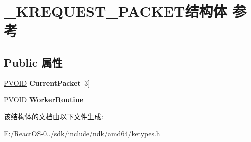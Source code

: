\hypertarget{struct___k_r_e_q_u_e_s_t___p_a_c_k_e_t}{}\section{\+\_\+\+K\+R\+E\+Q\+U\+E\+S\+T\+\_\+\+P\+A\+C\+K\+E\+T结构体 参考}
\label{struct___k_r_e_q_u_e_s_t___p_a_c_k_e_t}
\subsection*{Public 属性}
\begin{DoxyCompactItemize}
\item 
\mbox{\label{struct___k_r_e_q_u_e_s_t___p_a_c_k_e_t_aa53e0e21171918bcb9c66d429fe69865}} 
\hyperlink{interfacevoid}{P\+V\+O\+ID} {\bfseries Current\+Packet} \mbox{[}3\mbox{]}
\item 
\mbox{\label{struct___k_r_e_q_u_e_s_t___p_a_c_k_e_t_a6ad893c3118380bf6d39e5572e83d33c}} 
\hyperlink{interfacevoid}{P\+V\+O\+ID} {\bfseries Worker\+Routine}
\end{DoxyCompactItemize}


该结构体的文档由以下文件生成\+:\begin{DoxyCompactItemize}
\item 
E\+:/\+React\+O\+S-\/0../sdk/include/ndk/amd64/ketypes.\+h\end{DoxyCompactItemize}
